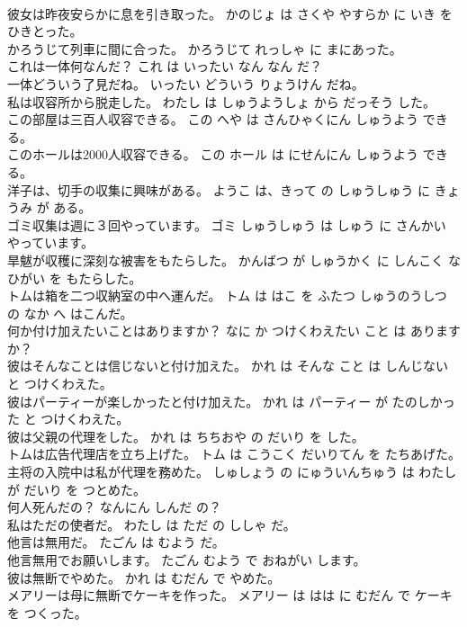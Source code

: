 \documentclass[8pt]{extreport}
\begin{document}
\begin{CJK}{UTF8}{min}
\\	彼女は昨夜安らかに息を引き取った。	かのじょ は さくや やすらか に いき を ひきとった。	
\\	かろうじて列車に間に合った。	かろうじて れっしゃ に まにあった。	
\\	これは一体何なんだ？	これ は いったい なん なん だ？	
\\	一体どういう了見だね。	いったい どういう りょうけん だね。	
\\	私は収容所から脱走した。	わたし は しゅうようしょ から だっそう した。	
\\	この部屋は三百人収容できる。	この へや は さんひゃくにん しゅうよう できる。	
\\	このホールは2000人収容できる。	この ホール は にせんにん しゅうよう できる。	
\\	洋子は、切手の収集に興味がある。	ようこ は、きって の しゅうしゅう に きょうみ が ある。	
\\	ゴミ収集は週に３回やっています。	ゴミ しゅうしゅう は しゅう に さんかい やっています。	
\\	旱魃が収穫に深刻な被害をもたらした。	かんばつ が しゅうかく に しんこく な ひがい を もたらした。	
\\	トムは箱を二つ収納室の中へ運んだ。	トム は はこ を ふたつ しゅうのうしつ の なか へ はこんだ。	
\\	何か付け加えたいことはありますか？	なに か つけくわえたい こと は あります か？	
\\	彼はそんなことは信じないと付け加えた。	かれ は そんな こと は しんじない と つけくわえた。	
\\	彼はパーティーが楽しかったと付け加えた。	かれ は パーティー が たのしかった と つけくわえた。	
\\	彼は父親の代理をした。	かれ は ちちおや の だいり を した。	
\\	トムは広告代理店を立ち上げた。	トム は こうこく だいりてん を たちあげた。	
\\	主将の入院中は私が代理を務めた。	しゅしょう の にゅういんちゅう は わたし が だいり を つとめた。	
\\	何人死んだの？	なんにん しんだ の？	
\\	私はただの使者だ。	わたし は ただ の ししゃ だ。	
\\	他言は無用だ。	たごん は むよう だ。	
\\	他言無用でお願いします。	たごん むよう で おねがい します。	
\\	彼は無断でやめた。	かれ は むだん で やめた。	
\\	メアリーは母に無断でケーキを作った。	メアリー は はは に むだん で ケーキ を つくった。	

\end{CJK}
\end{document}
